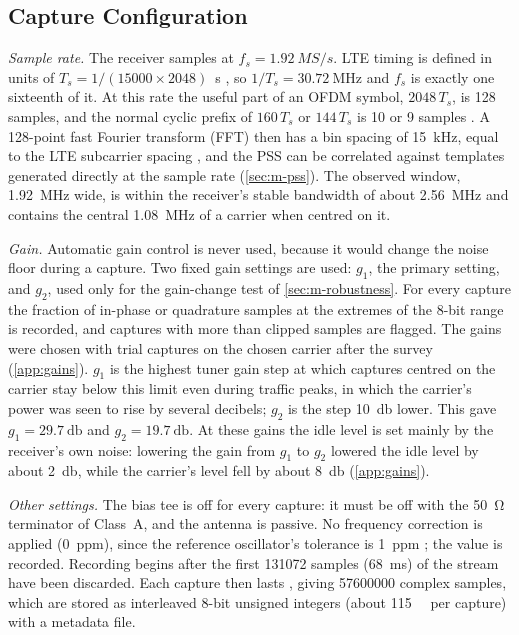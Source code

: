 \subsection{Capture Configuration}
\label{sec:m-capture}

\emph{Sample rate.} The receiver samples at $f_s = \qty{1.92}{MS/s}$. LTE timing is defined in units of $T_s = 1/(15000 \times 2048)$~s \parencite[clause~4]{3gpp2026a}, so $1/T_s = \qty{30.72}{\mega\hertz}$ and $f_s$ is exactly one sixteenth of it. At this rate the useful part of an OFDM symbol, $2048\,T_s$, is 128 samples, and the normal cyclic prefix of $160\,T_s$ or $144\,T_s$ is 10 or 9 samples \parencite[clause~6.12, Table~6.12-1]{3gpp2026a}. A 128-point fast Fourier transform (FFT) then has a bin spacing of \qty{15}{\kilo\hertz}, equal to the LTE subcarrier spacing \parencite[Table~6.2.3-1]{3gpp2026a}, and the PSS can be correlated against templates generated directly at the sample rate (\cref{sec:m-pss}). The observed window, \qty{1.92}{\mega\hertz} wide, is within the receiver's stable bandwidth of about \qty{2.56}{\mega\hertz} \parencite{rtlsdrblog2024} and contains the central \qty{1.08}{\mega\hertz} of a carrier when centred on it.

\emph{Gain.} Automatic gain control is never used, because it would change the noise floor during a capture. Two fixed gain settings are used: $g_1$, the primary setting, and $g_2$, used only for the gain-change test of \cref{sec:m-robustness}. For every capture the fraction of in-phase or quadrature samples at the extremes of the 8-bit range is recorded, and captures with more than  clipped samples are flagged. The gains were chosen with trial captures on the chosen carrier after the survey (\cref{app:gains}). $g_1$ is the highest tuner gain step at which captures centred on the carrier stay below this limit even during traffic peaks, in which the carrier's power was seen to rise by several decibels; $g_2$ is the step \qty{10}{\decibel} lower. This gave $g_1 = \qty{29.7}{\decibel}$ and $g_2 = \qty{19.7}{\decibel}$. At these gains the idle level is set mainly by the receiver's own noise: lowering the gain from $g_1$ to $g_2$ lowered the idle level by about \qty{2}{\decibel}, while the carrier's level fell by about \qty{8}{\decibel} (\cref{app:gains}).

\emph{Other settings.} The bias tee is off for every capture: it must be off with the \qty{50}{\ohm} terminator of Class~A, and the antenna is passive. No frequency correction is applied (\qty{0}{ppm}), since the reference oscillator's tolerance is \qty{1}{ppm} \parencite{rtlsdrblog2024}; the value is recorded. Recording begins after the first \num{131072} samples (\qty{68}{\milli\second}) of the stream have been discarded. Each capture then lasts , giving \num{57600000} complex samples, which are stored as interleaved 8-bit unsigned integers (about \qty{115}{\mega\byte} per capture) with a metadata file.

